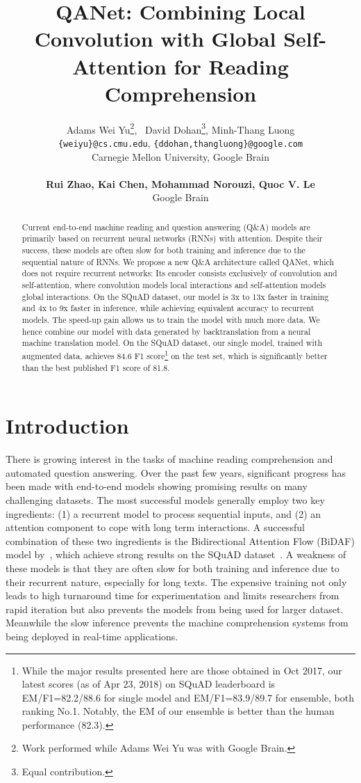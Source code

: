 \documentclass{article} \usepackage{iclr2018_conference,times}
\title{QANet: Combining Local Convolution with Global Self-Attention for Reading Comprehension}
\author{Adams Wei Yu\thanks{Work performed while Adams Wei Yu was with Google Brain.},
~David Dohan\thanks{Equal contribution.}, Minh-Thang Luong\samethanks[2]\\
\texttt{\{weiyu\}@cs.cmu.edu}, \texttt{\{ddohan,thangluong\}@google.com} \\
Carnegie Mellon University, Google Brain \\\\
\textbf{Rui Zhao, Kai Chen, Mohammad Norouzi, Quoc V. Le}\\
Google Brain \\
}
\begin{document}
\maketitle

\begin{abstract}
 Current end-to-end machine reading and question answering (Q\&A) models are primarily based on recurrent neural networks (RNNs) with attention. Despite their success, these models are often slow for both training and inference due to the sequential nature of RNNs. We propose a new Q\&A architecture called QANet, which does not require recurrent networks:  Its encoder consists exclusively of convolution and self-attention, where convolution models local interactions and self-attention models global interactions. On the SQuAD dataset, our model is 3x to 13x faster in training and 4x to 9x faster in inference, while achieving equivalent accuracy to recurrent models. The speed-up gain allows us to train the model with much more data. We hence  combine our model with data generated by backtranslation from a neural machine translation model.  
On the SQuAD dataset, our single model, trained with augmented data, achieves 84.6 F1 score\footnote{While the major results presented here are those obtained in Oct 2017, our latest scores (as of Apr 23, 2018) on SQuAD leaderboard is EM/F1=82.2/88.6 for single model and EM/F1=83.9/89.7 for ensemble, both ranking No.1. Notably, the EM of our ensemble is better than the human performance (82.3).} on the test set, which is significantly better than the best published F1 score of 81.8.

 \end{abstract}

\section{Introduction}\label{sec:intro}

There is growing interest in the tasks of machine reading comprehension and automated question answering. Over the past few years, significant progress has been made with end-to-end models showing promising results on many challenging datasets. The most successful models generally employ two key ingredients: (1) a recurrent model to process sequential inputs, and (2) an attention component to cope with long term interactions. A successful combination of these two ingredients is the Bidirectional Attention Flow (BiDAF) model by~\cite{SeoKFH16}, which achieve strong results on the SQuAD dataset~\citep{RajpurkarZLL16}.  A weakness of these models is that they are often slow for both training and inference due to their recurrent nature, especially for long texts. 
The expensive training not only leads to high turnaround time for experimentation and limits researchers from rapid iteration but also prevents the models from being used for larger dataset. Meanwhile the slow inference prevents the machine comprehension systems from being deployed in real-time applications.
\end{document}
